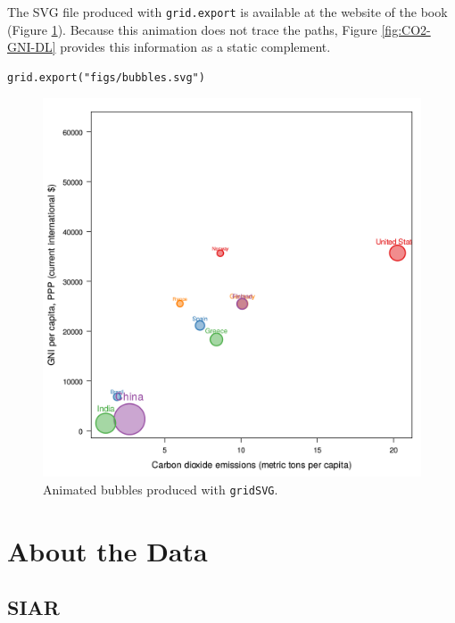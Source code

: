 \documentclass[smallroyalvopaper]{memoir}
\begin{document}
The SVG file produced with \texttt{grid.export} is available at the website
of the book (Figure \ref{fig:bubblesSVG}). Because this animation does
not trace the paths, Figure \ref{fig:CO2-GNI-DL} provides this
information as a static complement.


\lstset{language=r,label= ,caption= ,captionpos=b,numbers=none}
\begin{lstlisting}
grid.export("figs/bubbles.svg")
\end{lstlisting}

\begin{figure}[htbp]
\centering
\includegraphics[width=.9\linewidth]{figs/bubbles.png}
\caption{Animated bubbles produced with \texttt{gridSVG}. \label{fig:bubblesSVG}}
\end{figure}

\chapter{About the Data}
\label{sec:orge2d60cc}
\label{cha:dataTime}

\section{SIAR}
\label{sec:org23e529f}
\end{document}

